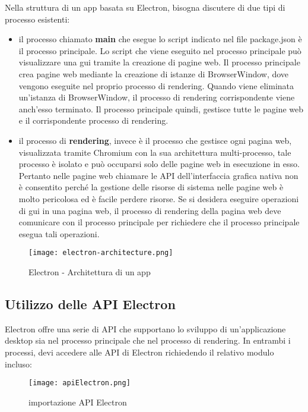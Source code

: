 Nella struttura di un app basata su Electron, bisogna discutere di due tipi di processo esistenti:
\begin{itemize}
	\item  il processo chiamato \textbf{main} che esegue lo script indicato nel file package.json è il processo principale. Lo script che viene eseguito nel processo principale può visualizzare una \Gls{gui} tramite la creazione di pagine web. Il processo principale crea pagine web mediante la creazione di istanze di BrowserWindow, dove vengono eseguite nel proprio processo di rendering. Quando viene eliminata un'istanza di BrowserWindow, il processo di rendering corrispondente viene anch'esso terminato. Il processo principale quindi, gestisce tutte le pagine web e il corrispondente processo di rendering.
	\item il processo di \textbf{rendering}, invece è il processo che gestisce ogni pagina web, visualizzata tramite Chromium con la sua architettura multi-processo, tale processo è isolato e può occuparsi solo delle pagine web in esecuzione in esso.
	Pertanto nelle pagine web chiamare le API dell'interfaccia grafica nativa non è consentito perché la gestione delle risorse di sistema nelle pagine web è molto pericolosa ed è facile perdere risorse. Se si desidera eseguire operazioni di \Gls{gui} in una pagina web, il processo di rendering della pagina web deve comunicare con il processo principale per richiedere che il processo principale esegua tali operazioni.
\end{itemize}

\begin{figure}[H]
    \centering
    \texttt{[image: electron-architecture.png]}
    \caption{Electron - Architettura di un app}
    \label{fig:ElectronArch}
\end{figure}


\subsection{Utilizzo delle API Electron}

Electron offre una serie di API che supportano lo sviluppo di un'applicazione desktop sia nel processo principale che nel processo di rendering. In entrambi i processi, devi accedere alle API di Electron richiedendo il relativo modulo incluso:

\begin{figure}[H]
    \centering
    \texttt{[image: apiElectron.png]}
    \caption{importazione API Electron}
    \label{fig:ApiElectron}
\end{figure}

